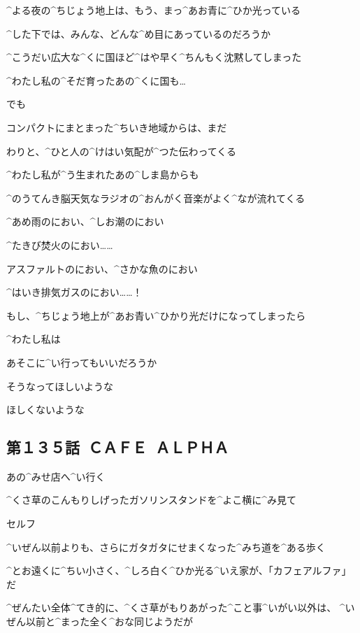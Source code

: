 \page
\AM ^{よる}{夜}の^{ちじょう}{地上}は、もう、まっ^{あお}{青}に^{ひか}{光}っている

\AM ^{した}{下}では、みんな、どんな^{め}{目}にあっているのだろうか

\page
\AM ^{こうだい}{広大}な^{くに}{国}ほど^{はや}{早}く^{ちんもく}{沈黙}してしまった

\AM ^{わたし}{私}の^{そだ}{育}ったあの^{くに}{国}も…

\AM でも

\AM コンパクトにまとまった^{ちいき}{地域}からは、まだ

\AM わりと、^{ひと}{人}の^{けはい}{気配}が^{つた}{伝}わってくる

\AM ^{わたし}{私}が^{う}{生}まれたあの^{しま}{島}からも

\AM ^{のうてんき}{脳天気}なラジオの^{おんがく}{音楽}がよく^{なが}{流}れてくる

\page[54]
\AM ^{あめ}{雨}のにおい、^{しお}{潮}のにおい

\AM ^{たきび}{焚火}のにおい……

\AM アスファルトのにおい、^{さかな}{魚}のにおい

\AM ^{はいき}{排気}ガスのにおい……！

\page
\AM もし、^{ちじょう}{地上}が^{あお}{青}い^{ひかり}{光}だけになってしまったら

\AM ^{わたし}{私}は

\AM あそこに^{い}{行}ってもいいだろうか

\AM そうなってほしいような

\AM ほしくないような


\subsection{第１３５話\ ＣＡＦＥ\ ＡＬＰＨＡ}

\page[58]
\N あの^{みせ}{店}へ^{い}{行}く

\page
\N ^{くさ}{草}のこんもりしげったガソリンスタンドを^{よこ}{横}に^{み}{見}て

\Sign セルフ

\N ^{いぜん}{以前}よりも、さらにガタガタにせまくなった^{みち}{道}を^{ある}{歩}く

\page
\N ^{とお}{遠}くに^{ちい}{小}さく、^{しろ}{白}く^{ひか}{光}る^{いえ}{家}が、「カフェアルファ」だ

\N ^{ぜんたい}{全体}^{てき}{的}に、^{くさ}{草}がもりあがった^{こと}{事}^{いがい}{以外}は、
^{いぜん}{以前}と^{まった}{全}く^{おな}{同}じようだが

